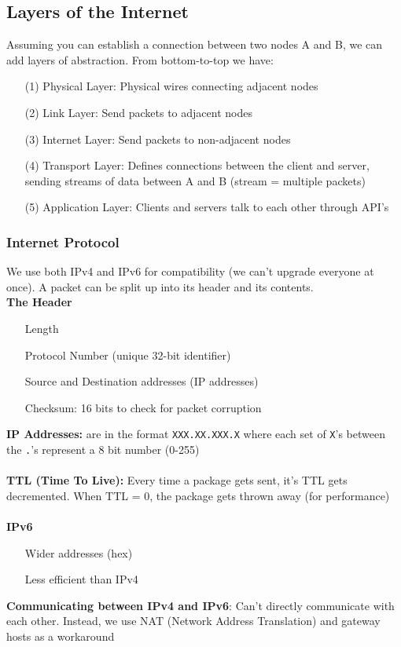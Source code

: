 \documentclass[13pt]{article}
\begin{document}
\subsection{Layers of the Internet}
Assuming you can establish a connection between two nodes A and B, we can add layers of abstraction. From bottom-to-top we have:
\begin{itemize}
\item [(1)] Physical Layer: Physical wires connecting adjacent nodes
\item [(2)] Link Layer: Send packets to adjacent nodes
\item [(3)] Internet Layer: Send packets to non-adjacent nodes
\item [(4)] Transport Layer: Defines connections between the client and server, sending streams of data between A and B (stream = multiple packets)
\item [(5)] Application Layer: Clients and servers talk to each other through API's
\end{itemize}

\subsubsection{Internet Protocol}
We use both IPv4 and IPv6 for compatibility (we can't upgrade everyone at once). A packet can be split up into its header and its contents. \\
\textbf{The Header}
\begin{itemize}[leftmargin = *pt]
\item [] Length
\item [] Protocol Number (unique 32-bit identifier)
\item [] Source and Destination addresses (IP addresses)
\item [] Checksum: 16 bits to check for packet corruption
\end{itemize}
\textbf{IP Addresses:} are in the format \texttt{XXX.XX.XXX.X} where each set of \texttt{X}'s between the \texttt{.}'s represent a 8 bit number (0-255) \\ \\
\textbf{TTL (Time To Live):} Every time a package gets sent, it's TTL gets decremented. When TTL = 0, the package gets thrown away (for performance) \\ \\
\textbf{IPv6}
\begin{itemize}[leftmargin = *pt]
\item [] Wider addresses (hex)
\item [] Less efficient than IPv4
\end{itemize}
\textbf{Communicating between IPv4 and IPv6}: Can't directly communicate with each other. Instead, we use NAT (Network Address Translation) and gateway hosts as a workaround
\end{document}
